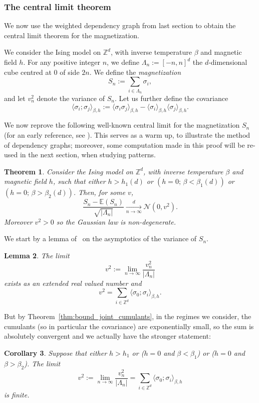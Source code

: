 \documentclass{amsart}
\newcommand{\field}[1]{\mathbb{#1}}
\newcommand{\Z}{\field{Z}}
\numberwithin{equation}{section}
\newtheorem{theorem}{Theorem}[section]
\newtheorem{lemma}[theorem]{Lemma}
\newtheorem{corollary}[theorem]{Corollary}
\theoremstyle{remark}
\begin{document}
\subsubsection{The central limit theorem}
We now use the weighted dependency graph from last section to obtain the central limit theorem for the magnetization.

We consider the Ising model on $\Z^d$, with inverse temperature $\beta$ and magnetic field $h$. For any positive integer $n$, we define $\Lambda_{n} := [-n,n]^d$ the $d$-dimensional cube centred at $0$ of side $2n$.
We define the \emph{magnetization}
$$S_{n} := \sum_{i \in \Lambda_n} \sigma_i,$$
and let $v_n^{2}$  denote the variance of $S_n$. Let us further define the covariance
$$\langle\sigma_i;\sigma_j\rangle_{\beta,h} := \langle\sigma_i \sigma_j\rangle_{\beta,h} -\langle\sigma_i\rangle_{\beta,h} \langle\sigma_j\rangle_{\beta,h}.$$

We now reprove the following well-known central limit for the magnetization $S_n$
(for an early reference, see \cite{Newman80}).
This serves as a warm up, to illustrate the method of dependency graphs;
moreover, some computation made in this proof will be re-used in the next section,
when studying patterns.
\begin{theorem}
\label{th:cltmagnet}
Consider the Ising model on $\Z^d$, with inverse temperature $\beta$ and magnetic field $h$, such that either $h > h_1(d)$ or $(h=0;\, \beta < \beta_1(d))$ or $(h=0;\, \beta > \beta_2(d))$.
Then, for some $v$,
$$\frac{S_n - \mathbb{E}(S_n) }{\sqrt{|\Lambda_n|}} \xrightarrow[n\to\infty]{d} \mathcal{N}(0, v^{2}).$$
Moreover $v^2 >0$ so the Gaussian law is non-degenerate.
\end{theorem}



We start by a lemma of~\cite{Ellis} on the asymptotics of the variance of $S_n$.
\begin{lemma} \cite[Lemma V.7.1]{Ellis}
\label{lem:ellis}
The limit
$$v^{2} := \lim_{n \rightarrow \infty} \frac{v_n^{2}}{|\Lambda_n|}$$
exists as an extended real valued number and
$$v^{2} = \sum_{i \in \Z^d} \langle\sigma_0;\sigma_i\rangle_{\beta,h}.$$
\end{lemma}

But by Theorem~\ref{thm:bound_joint_cumulants}, in the regimes we consider,
the cumulants (so in particular the covariance) are exponentially small, so the sum is absolutely convergent and we actually have the stronger statement:

\begin{corollary}
\label{cor:ellisfini}
Suppose that either $h > h_1$ or ($h=0$ and $\beta < \beta_1$) or ($h=0$ and $\beta > \beta_2$).
The limit
$$v^{2} := \lim_{n \rightarrow \infty} \frac{v_n^{2}}{|\Lambda_n|} =\sum_{i \in \Z^d} \langle\sigma_0;\sigma_i\rangle_{\beta,h}$$
is finite.
\end{corollary}
\end{document}

